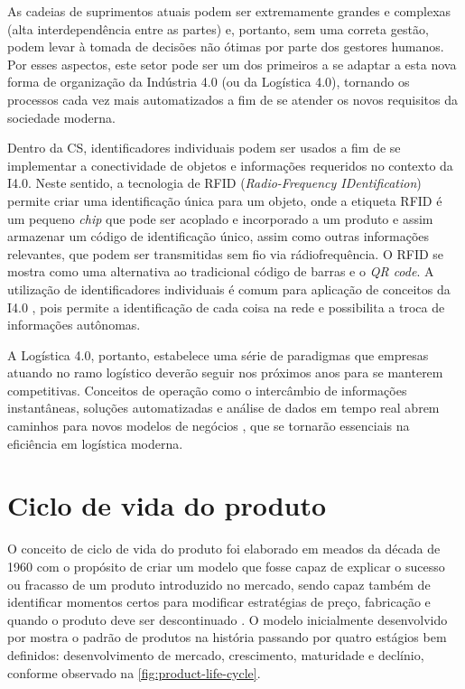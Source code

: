 As cadeias de suprimentos atuais podem ser extremamente grandes e complexas (alta interdependência entre as partes) e, portanto, sem uma correta gestão, podem levar à tomada de decisões não ótimas por parte dos gestores humanos. Por esses aspectos, este setor pode ser um dos primeiros a se adaptar a esta nova forma de organização da Indústria 4.0 (ou da Logística 4.0), tornando os processos cada vez mais automatizados a fim de se atender os novos requisitos da sociedade moderna.

Dentro da CS, identificadores individuais podem ser usados a fim de se implementar a conectividade de objetos e informações requeridos no contexto da I4.0. Neste sentido, a tecnologia de RFID (\textit{Radio-Frequency IDentification}) permite criar uma identificação única para um objeto, onde a etiqueta RFID é um pequeno \textit{chip} que pode ser acoplado e incorporado a um produto e assim armazenar um código de identificação único, assim como outras informações relevantes, que podem ser transmitidas sem fio via rádiofrequência. O RFID se mostra como uma alternativa ao tradicional código de barras e o \textit{QR code}. A utilização de identificadores individuais é comum para aplicação de conceitos da I4.0 \cite{alyahya2016rfidwarehousing, vlachos2014rfidimpact, fan2015inventory, bibi2017rfidfood}, pois permite a identificação de cada coisa na rede e possibilita a troca de informações autônomas.

A Logística 4.0, portanto, estabelece uma série de paradigmas que empresas atuando no ramo logístico deverão seguir nos próximos anos para se manterem competitivas. Conceitos de operação como o intercâmbio de informações instantâneas, soluções automatizadas e análise de dados em tempo real abrem caminhos para novos modelos de negócios \cite{strandhagen2017logistics}, que se tornarão essenciais na eficiência em logística moderna.


\section{Ciclo de vida do produto}

O conceito de ciclo de vida do produto foi elaborado em meados da década de 1960 com o propósito de criar um modelo que fosse capaz de explicar o sucesso ou fracasso de um produto introduzido no mercado, sendo capaz também de identificar momentos certos para modificar estratégias de preço, fabricação e quando o produto deve ser descontinuado \cite{cao2012lifecycle}. O modelo inicialmente desenvolvido por  mostra o padrão de produtos na história passando por quatro estágios bem definidos: desenvolvimento de mercado, crescimento, maturidade e declínio, conforme observado na \autoref{fig:product-life-cycle}.

